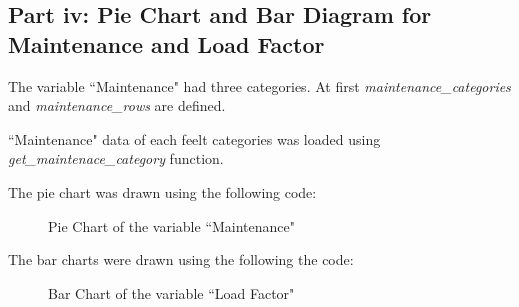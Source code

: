 \subsection{Part iv: Pie Chart and Bar Diagram for Maintenance and Load Factor}
The variable ``Maintenance" had three categories. At first \textit{maintenance\_categories} and \textit{maintenance\_rows} are defined.


``Maintenance" data of each feelt categories was loaded using \textit{get\_maintenace\_category} function.


The pie chart was drawn using the following code:


\begin{figure}[H]
    \centering


    \caption{Pie Chart of the variable ``Maintenance"}
\end{figure}

The bar charts were drawn using the following the code:


\begin{figure}[H]
    \centering
    \caption{Bar Chart of the variable ``Load Factor"}
\end{figure}
